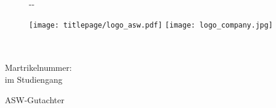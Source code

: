 \makeatletter
\begin{titlepage}
    \begin{figure}[t]
        \begin{adjustwidth}{-\oddsidemargin-1in}{-\rightmargin}

            \minipage{0pt}
              \noindent
            \endminipage

            \vspace*{10mm}
            \minipage{0.1\paperwidth}
              \hfill
            \endminipage
            \minipage{0.25\paperwidth}
              \texttt{[image: titlepage/logo\_asw.pdf]}
            \endminipage
            \minipage{0.3\paperwidth}
                \hfill
            \endminipage
            \minipage{0.25\paperwidth}
              \texttt{[image: logo\_company.jpg]}
            \endminipage

        \end{adjustwidth}
    \end{figure}

    \vspace*{2cm}

    \begin{flushleft}
        \Huge
        \textbf{\@title}\\[2cm]

        \LARGE
        {\@author}\\[0.5cm]

        \large
        Martrikelnummer: \varMartrikelnummer \\[0.5cm]

        \Large
        \varArbeit{} im Studiengang\\
        \varStudiengang
    \end{flushleft}

    \vspace{0.5cm}

    \begin{flushright}

        ASW-Gutachter\\
        \varASWGutachter\\[0.5cm]


\end{flushright}
\end{titlepage}
